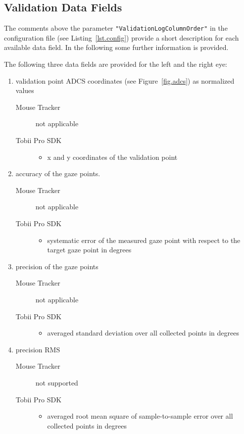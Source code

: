 \documentclass[a4paper,oneside]{book}
\begin{document}
\subsection{Validation Data Fields}
The comments above the parameter \texttt{"ValidationLogColumnOrder"} in the configuration file (see Listing~\ref{lst.config}) provide a short description for each available data field.
In the following some further information is provided.

The following three data fields are provided for the left and the right eye:
\begin{enumerate}
    \item validation point ADCS coordinates (see Figure~\ref{fig.adcs}) as normalized values
        \begin{description}
            \item[Mouse Tracker] not applicable
            \item[Tobii Pro SDK] \hfill
                \begin{itemize}
                    \item x and y coordinates of the validation point
                \end{itemize}
        \end{description}
    \item accuracy of the gaze points.
        \begin{description}
            \item[Mouse Tracker] not applicable
            \item[Tobii Pro SDK] \hfill
                \begin{itemize}
                    \item systematic error of the measured gaze point with respect to the target gaze point in degrees
                \end{itemize}
        \end{description}
    \item precision of the gaze points
        \begin{description}
            \item[Mouse Tracker] not applicable
            \item[Tobii Pro SDK] \hfill
                \begin{itemize}
                    \item averaged standard deviation over all collected points in degrees
                \end{itemize}
        \end{description}
    \item precision RMS
        \begin{description}
            \item[Mouse Tracker] not supported
            \item[Tobii Pro SDK] \hfill
                \begin{itemize}
                    \item averaged root mean square of sample-to-sample error over all collected points in degrees
                \end{itemize}
        \end{description}
\end{enumerate}
\end{document}

